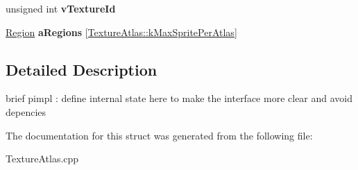 \begin{DoxyCompactItemize}
\item 
\hypertarget{struct_texture_atlas_data_af916eb64927963704582b4f0fca67bff}{unsigned int {\bfseries v\-Texture\-Id}}\label{struct_texture_atlas_data_af916eb64927963704582b4f0fca67bff}

\item 
\hypertarget{struct_texture_atlas_data_a9363a9f2dddbfaf0b8d77a316ee7922b}{\hyperlink{struct_region}{Region} {\bfseries a\-Regions} \mbox{[}\hyperlink{class_texture_atlas_a94887a34f2e8a2b3ffa794e3561619d4}{Texture\-Atlas\-::k\-Max\-Sprite\-Per\-Atlas}\mbox{]}}\label{struct_texture_atlas_data_a9363a9f2dddbfaf0b8d77a316ee7922b}

\end{DoxyCompactItemize}


\subsection{Detailed Description}
brief pimpl \-: define internal state here to make the interface more clear and avoid depencies 

The documentation for this struct was generated from the following file\-:\begin{DoxyCompactItemize}
\item 
Texture\-Atlas.\-cpp\end{DoxyCompactItemize}
